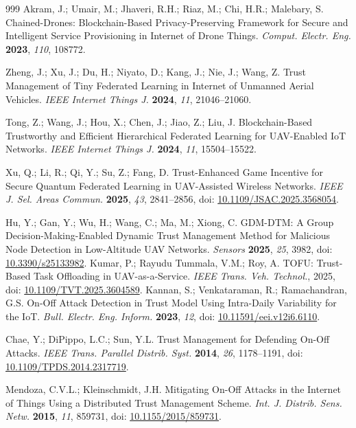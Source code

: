 \documentclass[notspecified,article,submit,moreauthors]{Definitions/mdpi}
\begin{document}
\begin{thebibliography}{999}
Akram, J.; Umair, M.; Jhaveri, R.H.; Riaz, M.; Chi, H.R.; Malebary, S. Chained-Drones: Blockchain-Based Privacy-Preserving Framework for Secure and Intelligent Service Provisioning in Internet of Drone Things. {\em Comput. Electr. Eng.} {\bf 2023}, {\em 110}, 108772.

Zheng, J.; Xu, J.; Du, H.; Niyato, D.; Kang, J.; Nie, J.; Wang, Z. Trust Management of Tiny Federated Learning in Internet of Unmanned Aerial Vehicles. {\em IEEE Internet Things J.} {\bf 2024}, {\em 11}, 21046--21060.

Tong, Z.; Wang, J.; Hou, X.; Chen, J.; Jiao, Z.; Liu, J. Blockchain-Based Trustworthy and Efficient Hierarchical Federated Learning for UAV-Enabled IoT Networks. {\em IEEE Internet Things J.} {\bf 2024}, {\em 11}, 15504--15522.

Xu, Q.; Li, R.; Qi, Y.; Su, Z.; Fang, D. Trust-Enhanced Game Incentive for Secure Quantum Federated Learning in UAV-Assisted Wireless Networks. {\em IEEE J. Sel. Areas Commun.} {\bf 2025}, {\em 43}, 2841--2856, doi: \href{https://doi.org/10.1109/JSAC.2025.3568054}{10.1109/JSAC.2025.3568054}.

Hu, Y.; Gan, Y.; Wu, H.; Wang, C.; Ma, M.; Xiong, C. GDM-DTM: A Group Decision-Making-Enabled Dynamic Trust Management Method for Malicious Node Detection in Low-Altitude UAV Networks. {\em Sensors} {\bf 2025}, {\em 25}, 3982, doi: \href{https://doi.org/10.3390/s25133982}{10.3390/s25133982}.
Kumar, P.; Rayudu Tummala, V.M.; Roy, A. TOFU: Trust-Based Task Offloading in UAV-as-a-Service. {\em IEEE Trans. Veh. Technol.}, 2025, doi: \href{https://doi.org/10.1109/TVT.2025.3604589}{10.1109/TVT.2025.3604589}.
Kannan, S.; Venkataraman, R.; Ramachandran, G.S. On-Off Attack Detection in Trust Model Using Intra-Daily Variability for the IoT. {\em Bull. Electr. Eng. Inform.} {\bf 2023}, {\em 12}, doi: \href{https://doi.org/10.11591/eei.v12i6.6110}{10.11591/eei.v12i6.6110}.

Chae, Y.; DiPippo, L.C.; Sun, Y.L. Trust Management for Defending On-Off Attacks. {\em IEEE Trans. Parallel Distrib. Syst.} {\bf 2014}, {\em 26}, 1178--1191, doi: \href{https://doi.org/10.1109/TPDS.2014.2317719}{10.1109/TPDS.2014.2317719}.

Mendoza, C.V.L.; Kleinschmidt, J.H. Mitigating On-Off Attacks in the Internet of Things Using a Distributed Trust Management Scheme. {\em Int. J. Distrib. Sens. Netw.} {\bf 2015}, {\em 11}, 859731, doi: \href{https://doi.org/10.1155/2015/859731}{10.1155/2015/859731}.


\end{thebibliography}
\end{document}
